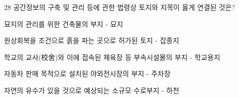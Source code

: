\begin{question}{28}
공간정보의 구축 및 관리 등에 관한 법령상 토지와 지목이 옳게 연결된 것은?
\begin{choices}
  \item 묘지의 관리를 위한 건축물의 부지 - 묘지
  \item 원상회복을 조건으로 흙을 파는 곳으로 허가된 토지 - 잡종지
  \item 학교의 교사(校舍)와 이에 접속된 체육장 등 부속시설물의 부지 - 학교용지
  \item 자동차 판매 목적으로 설치된 야외전시장의 부지 - 주차장
  \item 자연의 유수가 있을 것으로 예상되는 소규모 수로부지 - 하천
\end{choices}
\end{question}
